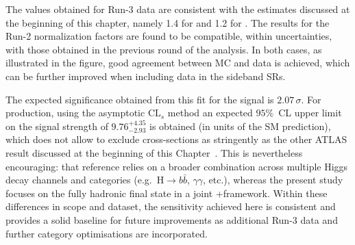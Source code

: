 The values obtained for Run-3 data are consistent with the estimates discussed at the beginning of this chapter, namely 1.4 for \ztautau and 1.2 for \ttbar. The results for the Run-2 normalization factors are found to be compatible, within uncertainties, with those obtained in the previous round of the analysis. In both cases, as illustrated in the figure, good agreement between MC and data is achieved, which can be further improved when including data in the sideband SRs.

The expected significance obtained from this fit for the \ttHtt signal is $2.07\,\sigma$. For \thqb production, using the asymptotic $\mathrm{CL}_{s}$ method an expected $95\%$~CL upper limit on the signal strength of $9.76^{+4.35}_{-2.93}$ is obtained (in units of the SM prediction), which does not allow to exclude cross-sections as stringently as the other ATLAS result discussed at the beginning of this Chapter~\cite{ATLAS:2025irr}. This is nevertheless encouraging: that reference relies on a broader combination across multiple Higgs decay channels and categories (e.g.\ $\mathrm{H}\!\to\! b\bar b$, $\gamma\gamma$, etc.), whereas the present study focuses on the \htautau fully hadronic final state in a joint \ttH+\thqb framework. Within these differences in scope and dataset, the sensitivity achieved here is consistent and provides a solid baseline for future improvements as additional Run-3 data and further category optimisations are incorporated.










